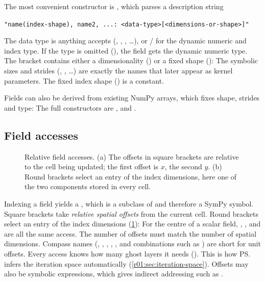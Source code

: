 The most convenient constructor is , which parses a description string
\begin{center}
  \texttt{"name(index-shape), name2, ...: <data-type>[<dimensions-or-shape>]"}
\end{center}
The data type is anything  accepts (,
, , \dots), or  /  for the dynamic
numeric and index type. If the type is omitted (), the field gets the
dynamic numeric type. The bracket contains either a dimensionality () or a
fixed shape ():
The symbolic sizes and strides (, , \dots) are
exactly the names that later appear as kernel parameters. The fixed index shape
() is a constant.

Fields can also be derived from existing NumPy arrays, which fixes shape, strides and
type:
The full constructors are ,
 and
.

\subsection{Field accesses}\label{r01:sec:field-access}


\begin{figure}[htbp]
  \centering
  
  \caption[Relative field accesses]{Relative field accesses. (a) The offsets in square brackets are relative to the cell being updated; the first offset is $x$, the second $y$. (b) Round brackets select an entry of the index dimensions, here one of the two components stored in every cell.}
  \label{r01:fig:field-access}
\end{figure}

Indexing a field yields a , which is a subclass of
 and therefore a SymPy symbol. Square brackets take \emph{relative
spatial offsets} from the current cell. Round brackets select an entry of the index
dimensions (\cref{r01:fig:field-access}):
For the centre of a scalar field, , ,  and
 are all the same access. The number of offsets must match the number of
spatial dimensions. Compass names
(, , , , ,  and combinations such as
) are short for unit offsets. Every access knows how many ghost layers it needs
(). This is how \ps{} infers the iteration space
automatically (\cref{r01:sec:iteration-space}). Offsets may also be symbolic expressions,
which gives indirect addressing such as .

